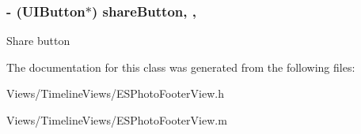 \subsubsection[{share\+Button}]{\setlength{\rightskip}{0pt plus 5cm}-\/ (U\+I\+Button$\ast$) share\+Button\hspace{0.3cm}{\ttfamily [read]}, {\ttfamily [nonatomic]}, {\ttfamily [assign]}}\label{interface_e_s_photo_footer_view_af521914fcde41e29e0c77020a8d3682a}
Share button 

The documentation for this class was generated from the following files\+:\begin{DoxyCompactItemize}
\item 
Views/\+Timeline\+Views/E\+S\+Photo\+Footer\+View.\+h\item 
Views/\+Timeline\+Views/E\+S\+Photo\+Footer\+View.\+m\end{DoxyCompactItemize}

